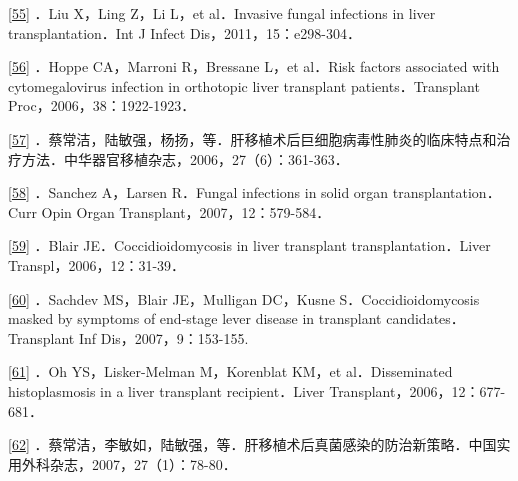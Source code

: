 \protect\hyperlink{text00020.htmlux5cux23ch55-19-back}{{[}55{]}} ．Liu
X，Ling Z，Li L，et al．Invasive fungal infections in liver
transplantation．Int J Infect Dis，2011，15：e298-304．

\protect\hyperlink{text00020.htmlux5cux23ch56-19-back}{{[}56{]}} ．Hoppe
CA，Marroni R，Bressane L，et al．Risk factors associated with
cytomegalovirus infection in orthotopic liver transplant
patients．Transplant Proc，2006，38：1922-1923．

\protect\hyperlink{text00020.htmlux5cux23ch57-19-back}{{[}57{]}}
．蔡常洁，陆敏强，杨扬，等．肝移植术后巨细胞病毒性肺炎的临床特点和治疗方法．中华器官移植杂志，2006，27（6）：361-363．

\protect\hyperlink{text00020.htmlux5cux23ch58-19-back}{{[}58{]}}
．Sanchez A，Larsen R．Fungal infections in solid organ
transplantation．Curr Opin Organ Transplant，2007，12：579-584．

\protect\hyperlink{text00020.htmlux5cux23ch59-19-back}{{[}59{]}} ．Blair
JE．Coccidioidomycosis in liver transplant transplantation．Liver
Transpl，2006，12：31-39．

\protect\hyperlink{text00020.htmlux5cux23ch60-19-back}{{[}60{]}}
．Sachdev MS，Blair JE，Mulligan DC，Kusne S．Coccidioidomycosis masked
by symptoms of end-stage lever disease in transplant
candidates．Transplant Inf Dis，2007，9：153-155.

\protect\hyperlink{text00020.htmlux5cux23ch61-19-back}{{[}61{]}} ．Oh
YS，Lisker-Melman M，Korenblat KM，et al．Disseminated histoplasmosis in
a liver transplant recipient．Liver Transplant，2006，12：677-681．

\protect\hyperlink{text00020.htmlux5cux23ch62-19-back}{{[}62{]}}
．蔡常洁，李敏如，陆敏强，等．肝移植术后真菌感染的防治新策略．中国实用外科杂志，2007，27（1）：78-80．

\protect\hypertarget{text00021.html}{}{}

